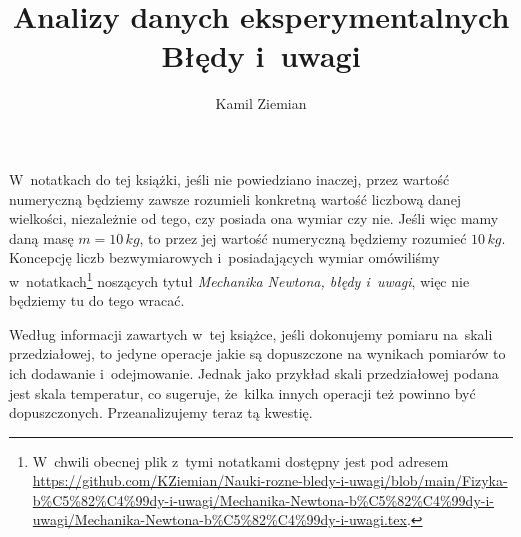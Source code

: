\documentclass[a4paper,11pt]{article}
\title{Analizy danych eksperymentalnych \\
  {\Large Błędy i~uwagi}}
\author{Kamil Ziemian}
\begin{document}





\maketitle %






\vspace{0em}



\vspace{0em}

\noindent
W~notatkach do tej książki, jeśli nie powiedziano inaczej, przez wartość
numeryczną będziemy zawsze rozumieli konkretną wartość liczbową danej
wielkości, niezależnie od tego, czy posiada ona wymiar czy nie. Jeśli więc
mamy daną masę $m = 10 \, \si{kg}$, to przez jej wartość numeryczną będziemy
rozumieć $10 \, \si{kg}$. Koncepcję liczb bezwymiarowych i~posiadających
wymiar omówiliśmy w~notatkach\footnote{W~chwili obecnej plik z~tymi notatkami
  dostępny jest pod adresem
  \href{https://github.com/KZiemian/Nauki-rozne-bledy-i-uwagi/blob/main/Fizyka-b\%C5\%82\%C4\%99dy-i-uwagi/Mechanika-Newtona-b\%C5\%82\%C4\%99dy-i-uwagi/Mechanika-Newtona-b\%C5\%82\%C4\%99dy-i-uwagi.tex}{https://github.com/KZiemian/Nauki-rozne-bledy-i-uwagi/blob/main/Fizyka-b\%C5\%82\%C4\%99dy-i-uwagi/Mechanika-Newtona-b\%C5\%82\%C4\%99dy-i-uwagi/Mechanika-Newtona-b\%C5\%82\%C4\%99dy-i-uwagi.tex}.}
noszących tytuł \textit{Mechanika Newtona, błędy i~uwagi}, więc nie będziemy
tu do tego wracać.






\vspace{0em}


\noindent
{} Według informacji zawartych w~tej książce, jeśli dokonujemy pomiaru
na~skali przedziałowej, to jedyne operacje jakie są dopuszczone na wynikach
pomiarów to ich dodawanie i~odejmowanie. Jednak jako przykład skali
przedziałowej podana jest skala temperatur, co sugeruje, że~kilka innych
operacji też powinno być dopuszczonych. Przeanalizujemy teraz tą kwestię.
\end{document}
